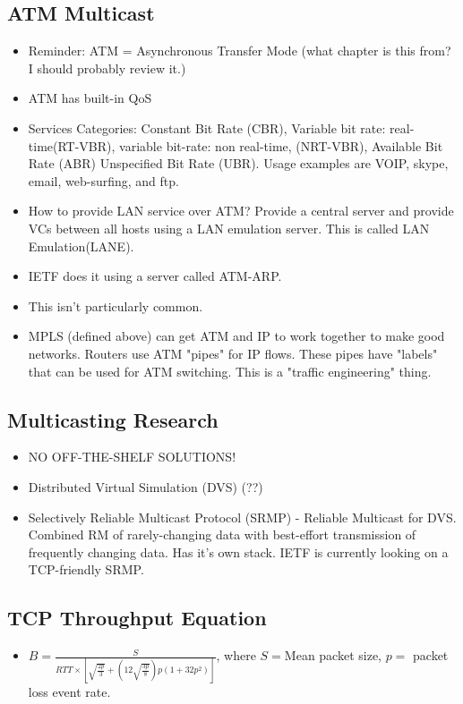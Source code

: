 \documentclass{scrartcl}
\begin{document}
\subsection*{ATM Multicast}
\begin{itemize}
\item Reminder: ATM = Asynchronous Transfer Mode (what chapter is this from?
I should probably review it.)
\item ATM has built-in QoS
\item Services Categories: Constant Bit Rate (CBR), Variable bit rate:
real-time(RT-VBR), variable bit-rate: non real-time, (NRT-VBR), Available Bit
Rate (ABR)
Unspecified Bit Rate (UBR). Usage examples are VOIP, skype, email, web-surfing,
and ftp.
\item How to provide LAN service over ATM? Provide a central server and provide
VCs between all hosts using a LAN emulation server. This is called LAN
Emulation(LANE).
\item IETF does it using a server called ATM-ARP.
\item This isn't particularly common.
\item MPLS (defined above) can get ATM and IP to work together to make
good networks. Routers use ATM "pipes" for IP flows. These pipes have "labels"
that can be used for ATM switching. This is a "traffic engineering" thing.
\end{itemize}
\subsection*{Multicasting Research}
\begin{itemize}
\item NO OFF-THE-SHELF SOLUTIONS!
\item Distributed Virtual Simulation (DVS) (??)
\item Selectively Reliable Multicast Protocol (SRMP) - Reliable Multicast for
DVS. Combined RM of rarely-changing data with best-effort transmission of 
frequently changing data. Has it's own stack. IETF is currently looking on a
TCP-friendly SRMP.
\end{itemize}
\subsection*{TCP Throughput Equation}
\begin{itemize}
\item $B = \frac{S}{RTT \times [\sqrt{\frac{2p}{3}} +
(12\sqrt{\frac{3p}{8}})p(1+32p^2)]}$,
where $S = $Mean packet size, $p =$ packet loss event rate.
\end{itemize}
\end{document}
